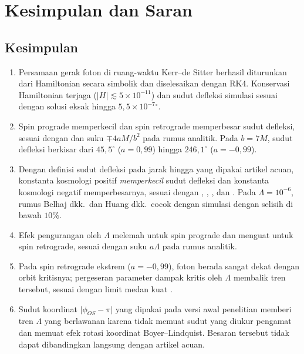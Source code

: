\documentclass[11pt,a4paper]{article}
\begin{document}
\section{Kesimpulan dan Saran}

\subsection{Kesimpulan}

\begin{enumerate}
  \item Persamaan gerak foton di ruang-waktu Kerr--de Sitter berhasil diturunkan dari Hamiltonian secara
        simbolik dan diselesaikan dengan RK4. Konservasi Hamiltonian terjaga ($|H| \lesssim 5\times10^{-11}$)
        dan sudut defleksi simulasi sesuai dengan solusi eksak hingga $5{,}5\times10^{-7}{}^\circ$.
  \item Spin prograde memperkecil dan spin retrograde memperbesar sudut defleksi, sesuai dengan
        \citet{congdon2022asymmetric} dan suku $\mp 4aM/b^2$ pada rumus analitik. Pada $b = 7M$, sudut
        defleksi berkisar dari $45{,}5^\circ$ ($a = 0{,}99$) hingga $246{,}1^\circ$ ($a = -0{,}99$).
  \item Dengan definisi sudut defleksi pada jarak hingga yang dipakai artikel acuan, konstanta kosmologi
        positif \emph{memperkecil} sudut defleksi dan konstanta kosmologi negatif memperbesarnya, sesuai
        dengan \citet{rindler2007contribution}, \citet{belhaj2022light}, \citet{huang2025influence}, dan
        \citet{pantig2024testing}. Pada $\Lambda = 10^{-6}$, rumus Belhaj dkk.\ dan Huang dkk.\ cocok dengan
        simulasi dengan selisih di bawah $10\%$.
  \item Efek pengurangan oleh $\Lambda$ melemah untuk spin prograde dan menguat untuk spin retrograde, sesuai
        dengan suku $a\Lambda$ pada rumus analitik.
  \item Pada spin retrograde ekstrem ($a = -0{,}99$), foton berada sangat dekat dengan orbit kritisnya;
        pergeseran parameter dampak kritis oleh $\Lambda$ membalik tren tersebut, sesuai dengan limit medan
        kuat \citet{bozza2002gravitational}.
  \item Sudut koordinat $\lvert\phi_{OS} - \pi\rvert$ yang dipakai pada versi awal penelitian memberi tren
        $\Lambda$ yang berlawanan karena tidak memuat sudut yang diukur pengamat dan memuat efek rotasi
        koordinat Boyer--Lindquist. Besaran tersebut tidak dapat dibandingkan langsung dengan artikel acuan.
\end{enumerate}
\end{document}
